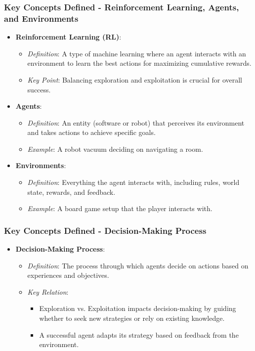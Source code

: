 \documentclass[aspectratio=169]{beamer}
\begin{document}
\begin{frame}[fragile]
    \frametitle{Key Concepts Defined - Reinforcement Learning, Agents, and Environments}
    \begin{itemize}
        \item \textbf{Reinforcement Learning (RL)}:
        \begin{itemize}
            \item \textit{Definition}: A type of machine learning where an agent interacts with an environment to learn the best actions for maximizing cumulative rewards.
            \item \textit{Key Point}: Balancing exploration and exploitation is crucial for overall success.
        \end{itemize}
        
        \item \textbf{Agents}:
        \begin{itemize}
            \item \textit{Definition}: An entity (software or robot) that perceives its environment and takes actions to achieve specific goals.
            \item \textit{Example}: A robot vacuum deciding on navigating a room.
        \end{itemize}
        
        \item \textbf{Environments}:
        \begin{itemize}
            \item \textit{Definition}: Everything the agent interacts with, including rules, world state, rewards, and feedback.
            \item \textit{Example}: A board game setup that the player interacts with.
        \end{itemize}
    \end{itemize}
\end{frame}

\begin{frame}[fragile]
    \frametitle{Key Concepts Defined - Decision-Making Process}
    \begin{itemize}
        \item \textbf{Decision-Making Process}:
        \begin{itemize}
            \item \textit{Definition}: The process through which agents decide on actions based on experiences and objectives.
            \item \textit{Key Relation}:
            \begin{itemize}
                \item Exploration vs. Exploitation impacts decision-making by guiding whether to seek new strategies or rely on existing knowledge.
                \item A successful agent adapts its strategy based on feedback from the environment.
            \end{itemize}
        \end{itemize}
    \end{itemize}
\end{frame}
\end{document}
